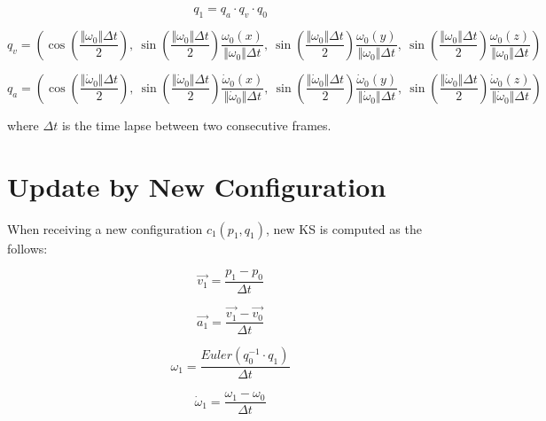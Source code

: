 \begin{appendices}
\begin{equation}
q_{1}=q_{a} \cdot q_{v} \cdot q_{0}
\end{equation}

\begin{equation}
q_{v}=\left(\cos(\frac{\Vert\omega_{0}\Vert\Delta t}{2}),\:\sin(\frac{\Vert\omega_{0}\Vert\Delta t}{2})\frac{\omega_{0}(x)}{\Vert\omega_{0}\Vert\Delta t},\:\sin(\frac{\Vert\omega_{0}\Vert\Delta t}{2})\frac{\omega_{0}(y)}{\Vert\omega_{0}\Vert\Delta t},\:\sin(\frac{\Vert\omega_{0}\Vert\Delta t}{2})\frac{\omega_{0}(z)}{\Vert\omega_{0}\Vert\Delta t}\right)
\end{equation}

\begin{equation}
q_{a}=\left(\cos(\frac{\Vert\dot{\omega}_{0}\Vert\Delta t}{2}),\:\sin(\frac{\Vert\dot{\omega}_{0}\Vert\Delta t}{2})\frac{\dot{\omega}_{0}(x)}{\Vert\dot{\omega}_{0}\Vert\Delta t},\:\sin(\frac{\Vert\dot{\omega}_{0}\Vert\Delta t}{2})\frac{\dot{\omega}_{0}(y)}{\Vert\dot{\omega}_{0}\Vert\Delta t},\:\sin(\frac{\Vert\dot{\omega}_{0}\Vert\Delta t}{2})\frac{\dot{\omega}_{0}(z)}{\Vert\dot{\omega}_{0}\Vert\Delta t}\right)
\end{equation}

where $\Delta t$ is the time lapse between two consecutive frames.

\section*{Update by New Configuration}
When receiving a new configuration $c_{1}(p_{1},q_{1})$, new KS is computed as the follows:

\begin{equation}
\overrightarrow{v_{1}}=\frac{p_{1}-p_{0}}{\Delta t}
\end{equation}

\begin{equation}
\overrightarrow{a_{1}}=\frac{\overrightarrow{v_{1}}-\overrightarrow{v_{0}}}{\Delta t}
\end{equation}

\begin{equation}
\omega_{1}=\frac{Euler(q_{0}^{-1} \cdot q_{1})}{\Delta t}
\end{equation}

\begin{equation}
\dot{\omega}_{1}=\frac{\omega_{1}-\omega_{0}}{\Delta t}
\end{equation}




\end{appendices}
